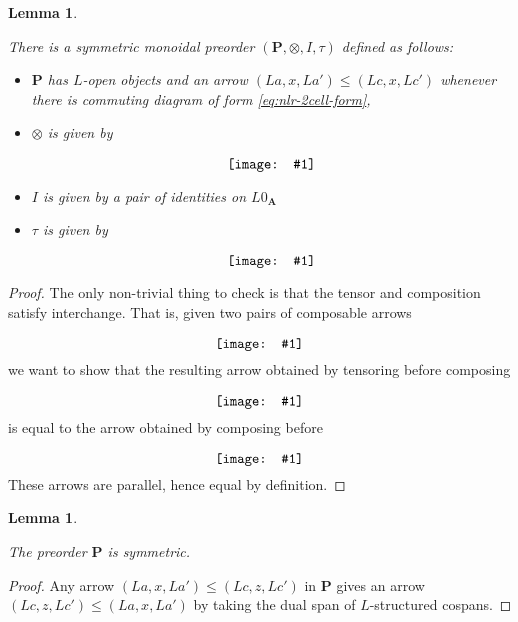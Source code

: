 \documentclass{amsart}
\newcommand{\A}{\cat{A}}
\newcommand{\NonLinArrCat}{\cat{P}}
\newcommand{\cat}[1]{\mathbf{#1}}
\newcommand{\diagram}[1]{\raisebox{-0.5\height}{\texttt{[image: \#1]}}}
\newtheorem{lemma}[theorem]{Lemma}
\theoremstyle{remark}
\theoremstyle{definition}
\begin{document}
\begin{lemma}
  \label{thm:dlb-rewr-arrcat}

  There is a symmetric monoidal preorder
  $ ( \NonLinArrCat , \otimes , I , \tau ) $ defined as follows:
  
  \begin{itemize}
  \item $ \NonLinArrCat $ has $ L $-open objects and an arrow
    $ ( La , x , La') \leq ( Lc , x , Lc') $ whenever
    there is commuting diagram of form \eqref{eq:nlr-2cell-form},
   \item $ \otimes $ is given by
       \[
         \diagram{diag_nlr_dbl-rewrite-tensor}
       \]
   \item $ I $ is given by a pair of identities on $ L0_{\A} $
   \item $ \tau $ is given by
     \[
	\diagram{diag_nlr_dbl-rewrite-braiding}
     \]
   \end{itemize}
    
\end{lemma}
  
\begin{proof}
  
  The only non-trivial thing to check is that the tensor and
  composition satisfy interchange. That is, given two pairs of
  composable arrows
  \[
    \diagram{diag_nlr_preorder-interchange}
  \]
  we want to show that the resulting arrow obtained by tensoring before composing
  \[
    \diagram{diag_nlr_preorder-tensor-compose}
  \]
  is equal to the arrow obtained by composing before
  \[
    \diagram{diag_nlr_preorder-compose-tensor}
  \]
  These arrows are parallel, hence equal by definition.
  
\end{proof}

\begin{lemma}
  \label{thm:preord-symm}
  
  The preorder $ \NonLinArrCat $ is symmetric.
  
\end{lemma}

\begin{proof}
  
  Any arrow $ ( La , x , La' ) \leq ( Lc , z , Lc' ) $ in
  $ \NonLinArrCat $ gives an arrow
  $ ( Lc , z , Lc' ) \leq ( La , x , La' ) $ by taking the
  dual span of $ L $-structured cospans.
  
\end{proof}
\end{document}
